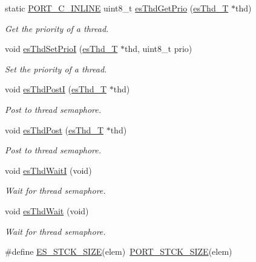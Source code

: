 \begin{DoxyCompactItemize}
static \hyperlink{group__template__compiler_ga87952d6e574c7f437503926e833ba345}{P\-O\-R\-T\-\_\-\-C\-\_\-\-I\-N\-L\-I\-N\-E} uint8\-\_\-t \hyperlink{group__kern__intf_ga6d2d033dc7e1226eccf4a51c666678ad}{es\-Thd\-Get\-Prio} (\hyperlink{group__kern__intf_ga62e3a3ca0a4597a19c43cb8868810d82}{es\-Thd\-\_\-\-T} $\ast$thd)
\begin{DoxyCompactList}\small\item\em Get the priority of a thread. \end{DoxyCompactList}\item 
void \hyperlink{group__kern__intf_ga8eaa731d0026a8a1667d4422d5031df6}{es\-Thd\-Set\-Prio\-I} (\hyperlink{group__kern__intf_ga62e3a3ca0a4597a19c43cb8868810d82}{es\-Thd\-\_\-\-T} $\ast$thd, uint8\-\_\-t prio)
\begin{DoxyCompactList}\small\item\em Set the priority of a thread. \end{DoxyCompactList}\item 
void \hyperlink{group__kern__intf_ga1c846f96eb842774a35fb1f8f720a229}{es\-Thd\-Post\-I} (\hyperlink{group__kern__intf_ga62e3a3ca0a4597a19c43cb8868810d82}{es\-Thd\-\_\-\-T} $\ast$thd)
\begin{DoxyCompactList}\small\item\em Post to thread semaphore. \end{DoxyCompactList}\item 
void \hyperlink{group__kern__intf_ga2505a886a7bc006061317a4924651e7c}{es\-Thd\-Post} (\hyperlink{group__kern__intf_ga62e3a3ca0a4597a19c43cb8868810d82}{es\-Thd\-\_\-\-T} $\ast$thd)
\begin{DoxyCompactList}\small\item\em Post to thread semaphore. \end{DoxyCompactList}\item 
void \hyperlink{group__kern__intf_ga6835afa8c355e01dc35a83310770a47c}{es\-Thd\-Wait\-I} (void)
\begin{DoxyCompactList}\small\item\em Wait for thread semaphore. \end{DoxyCompactList}\item 
void \hyperlink{group__kern__intf_gabbe4d89d1eba04a007fc39a9db6a5db9}{es\-Thd\-Wait} (void)
\begin{DoxyCompactList}\small\item\em Wait for thread semaphore. \end{DoxyCompactList}\item 
\#define \hyperlink{group__kern__intf_gaa707debebe3f98439911212b0cc8b3d1}{E\-S\-\_\-\-S\-T\-C\-K\-\_\-\-S\-I\-Z\-E}(elem)~\hyperlink{group__template__cpu__intf_gacb3a46e89d327fbaf5c122fe23877b24}{P\-O\-R\-T\-\_\-\-S\-T\-C\-K\-\_\-\-S\-I\-Z\-E}(elem)

\end{DoxyCompactItemize}
